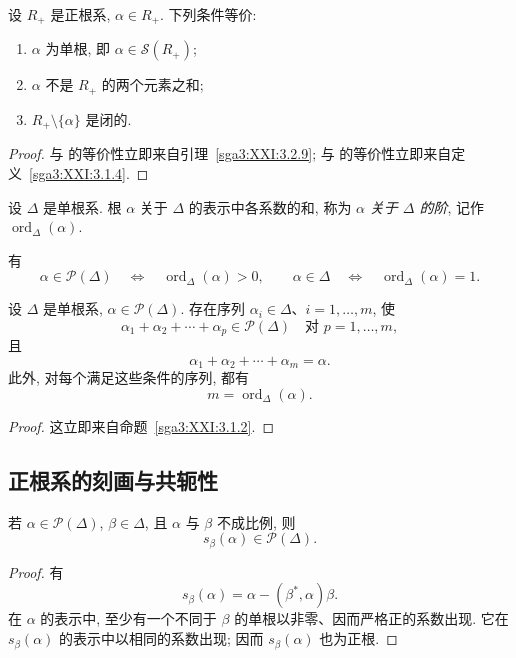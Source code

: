 \begin{corollary}\label{sga3:XXI:3.2.14}
设 \(R_+\) 是正根系, \(\alpha\in R_+\). 下列条件等价:
\begin{enumerate}
\item[\SGAInlineRefTarget{sga3:XXI:3.2.14:item:i}(i)] \(\alpha\) 为单根, 即 \(\alpha\in\mathscr{S}(R_+)\);
\item[\SGAInlineRefTarget{sga3:XXI:3.2.14:item:ii}(ii)] \(\alpha\) 不是 \(R_+\) 的两个元素之和;
\item[(iii)] \(R_+\setminus\{\alpha\}\) 是闭的.
\end{enumerate}
\end{corollary}
\begin{proof}
 与  的等价性立即来自引理~\ref{sga3:XXI:3.2.9};  与  的等价性立即来自定义~\ref{sga3:XXI:3.1.4}.
\end{proof}

\begin{definition}\label{sga3:XXI:3.2.15}
设 \(\Delta\) 是单根系. 根 \(\alpha\) 关于 \(\Delta\) 的表示中各系数的和, 称为 \(\alpha\) \emph{关于 \(\Delta\) 的阶}, 记作 \(\operatorname{ord}_\Delta(\alpha)\).
\end{definition}
有
\[
 \alpha\in\mathscr{P}(\Delta)
 \quad\Longleftrightarrow\quad
 \operatorname{ord}_\Delta(\alpha)>0,
 \qquad
 \alpha\in\Delta
 \quad\Longleftrightarrow\quad
 \operatorname{ord}_\Delta(\alpha)=1.
\]

\begin{lemma}\label{sga3:XXI:3.2.16}
设 \(\Delta\) 是单根系, \(\alpha\in\mathscr{P}(\Delta)\). 存在序列 \(\alpha_i\in\Delta\)、\(i=1,\ldots,m\), 使
\[
 \alpha_1+\alpha_2+\cdots+\alpha_p\in\mathscr{P}(\Delta)
 \quad\text{对 }p=1,\ldots,m,
\]
且
\[
 \alpha_1+\alpha_2+\cdots+\alpha_m=\alpha.
\]
此外, 对每个满足这些条件的序列, 都有
\[
 m=\operatorname{ord}_\Delta(\alpha).
\]
\end{lemma}
\begin{proof}
这立即来自命题~\ref{sga3:XXI:3.1.2}.
\end{proof}

\subsection{正根系的刻画与共轭性}
\begin{lemma}\label{sga3:XXI:3.3.1}
若 \(\alpha\in\mathscr{P}(\Delta)\), \(\beta\in\Delta\), 且 \(\alpha\) 与 \(\beta\) 不成比例, 则
\[
 s_\beta(\alpha)\in\mathscr{P}(\Delta).
\]
\end{lemma}
\begin{proof}
有
\[
 s_\beta(\alpha)=\alpha-(\beta^\ast,\alpha)\beta.
\]
在 \(\alpha\) 的表示中, 至少有一个不同于 \(\beta\) 的单根以非零、因而严格正的系数出现. 它在 \(s_\beta(\alpha)\) 的表示中以相同的系数出现; 因而 \(s_\beta(\alpha)\) 也为正根.
\end{proof}

